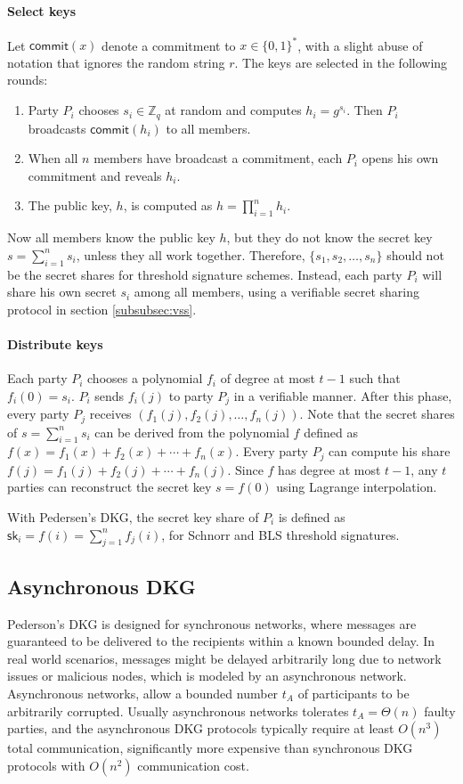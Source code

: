 \paragraph{Select keys} Let $\mathsf{commit}(x)$ denote a commitment to $x\in\{0,1\}^\ast$, with a slight abuse of notation that ignores the random string $r$. The keys are selected in the following rounds:

\begin{enumerate}
    \item Party $P_i$ chooses $s_i\in \mathbb{Z}_q$ at random and computes $h_i = g^{s_i}$. Then $P_i$ broadcasts $\mathsf{commit}(h_i)$ to all members. 
    \item When all $n$ members have broadcast a commitment, each $P_i$ opens his own commitment and reveals $h_i$. 
    \item The public key, $h$, is computed as $h = \prod_{i=1}^n h_i$. 
\end{enumerate}

Now all members know the public key $h$, but they do not know the secret key $s=\sum_{i=1}^n s_i$, unless they all work together. Therefore, $\{s_1, s_2,\dots, s_n\}$ should not be the secret shares for threshold signature schemes. Instead, each party $P_i$ will share his own secret $s_i$ among all members, using a verifiable secret sharing protocol in section \ref{subsubsec:vss}. 

\paragraph{Distribute keys} Each party $P_i$ chooses a polynomial $f_i$ of degree at most $t-1$ such that $f_i(0)= s_i$. $P_i$ sends $f_i(j)$ to party $P_j$ in a verifiable manner. After this phase, every party $P_j$ receives $(f_1(j), f_2(j), \dots, f_n(j))$. Note that the secret shares of $s=\sum_{i=1}^n s_i$ can be derived from the polynomial $f$ defined as $f(x)=f_1(x) + f_2(x) + \cdots + f_n(x)$. Every party $P_j$ can compute his share $f(j) = f_1(j)+f_2(j)+\cdots+f_n(j)$. Since $f$ has degree at most $t-1$, any $t$ parties can reconstruct the secret key $s=f(0)$ using Lagrange interpolation. 

With Pedersen's DKG, the secret key share of $P_i$ is defined as $\mathsf{sk}_i = f(i)=\sum_{j=1}^n f_j(i)$, for Schnorr and BLS threshold signatures. 

\subsection{Asynchronous DKG} 
Pederson's DKG is designed for synchronous networks, where messages are guaranteed to be delivered to the recipients within a known bounded delay. In real world scenarios, messages might be delayed arbitrarily long due to network issues or malicious nodes, which is modeled by an asynchronous network. Asynchronous networks, allow a bounded number $t_{A}$ of participants to be arbitrarily corrupted. Usually asynchronous networks tolerates $t_A = \Theta(n)$ faulty parties, and the asynchronous DKG protocols typically require at least $O(n^3)$ total communication, significantly more expensive than synchronous DKG protocols with $O(n^2)$ communication cost. 


